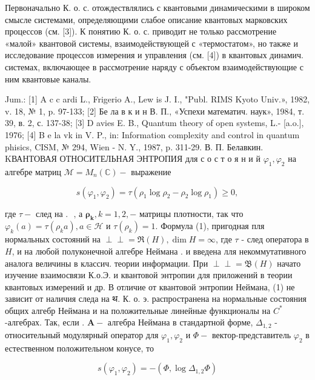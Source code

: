 \documentclass[10pt]{article}
\def\Perp{\perp\!\!\!\perp}
\begin{document}
Первоначально К. о. с. отождествлялись с квантовыми динамическими в широком смысле системами, определяющими слабое описание квантовых марковских процессов (см. [3]). К понятию К. о. с. приводит не только рассмотрение «малой» квантовой системы, взаимодействующей с «термостатом», но также и исследование процессов измерения и управления (см. [4]) в квантовых динамич. системах, включающее в рассмотрение наряду с объектом взаимодействующие с ним квантовые каналы.



Jum.: [1] A c c ardi L., Frigerio A., Lew is J. I., "Publ. RIMS Kyoto Univ.», 1982, v. 18, № 1, p. 97-133; [2] Бе ла в к и н В. П., «Успехи математич. наук», 1984, т. 39, в. 2, с. 137-38; [3] D avies E. B., Quantum theory of open systems, L.- [a.o.], 1976; [4] B e la vk in V. P., in: Information complexity and control in quantum phisics, CISM, № 294, Wien - N. Y., 1987, p. 311-29. В. П. Белавкин. KВАНТОВАЯ ОТНОСИТЕЛЬНАЯ ЭНТРОПИЯ для с о с т о я н и й $\varphi_{1}, \varphi_{2}$ на алгебре матриц $\mathscr{M}=M_{n}(\mathbb{C})-$ выражение



\[

s\left(\varphi_{1}, \varphi_{2}\right)=\tau\left(\rho_{1} \log \rho_{2}-\rho_{2} \log \rho_{1}\right) \geqslant 0,

\]



где $\tau-$ след на . $\boldsymbol{\text { , а } \rho _ { k }}, k=1,2,-$ матрицы плотности, так что $\varphi_{k}(a)=\tau\left(\rho_{k} a\right), a \in \mathcal{H}$ и $\tau\left(\rho_{k}\right)=1$. Формула (1), пригодная пля нормальных состояний на $\Perp=\Re(H), \operatorname{dim} H=\infty$, где $\tau$ - след оператора в $H$, и на любой полуконечной алгебре Неймана . $и$ введена лля некоммутативного аналога величины в классич. теории информации. При $\mathscr{\Perp}=\mathfrak{B}(H)$ начато изучение взаимосвязи К.о.Э. и квантовой энтропии для приложений в теории квантовых измерений и др. В отличие от квантовой энтропии Неймана, (1) не зависит от наличия следа на थ. К. о. э. распространена на нормальные состояния общих алгебр Неймана и на положительные линейные функционалы на $C^{*}$-алгебрах. Так, если . $\boldsymbol{A}-$ алгебра Неймана в стандартной форме, $\Delta_{1,2}$ - относительный модулярный оператор для $\varphi_{1}, \varphi_{2}$ и $\Phi-$ вектор-представитель $\varphi_{2}$ в естественном положительном конусе, то



\[

s\left(\varphi_{1}, \varphi_{2}\right)=-\left(\Phi, \log \Delta_{1,2} \Phi\right)

\]
\end{document}
